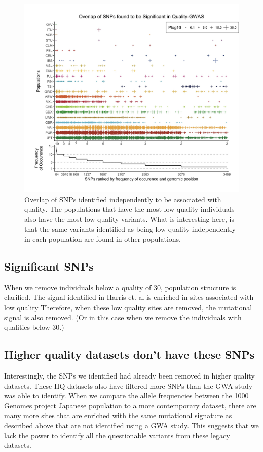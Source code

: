 \documentclass[12pt,twocolumn]{article}
\begin{document}
\begin{figure}
\includegraphics[width=\hsize,keepaspectratio]{SNPOverlap6.jpg}

\caption{Overlap of SNPs identified independently to be associated with quality. The populations that have the most low-quality individuals also have the most low-quality variants. What is interesting here, is that the same variants identified as being low quality independently in each population are found in other populations. }
  \label{Figure3}
\end{figure}

	\subsection{Significant SNPs}
When we remove individuals below a quality of 30, population structure is clarified. 
The signal identified in Harris et. al is enriched in sites associated with low quality
Therefore, when these low quality sites are removed, the mutational signal is also removed. (Or in this case when we remove the individuals with qualities below 30.)

	\subsection{Higher quality datasets don't have these SNPs}

Interestingly, the SNPs we identified had already been removed in higher quality datasets. 
These HQ datasets also have filtered more SNPs than the GWA study was able to identify. 
When we compare the allele frequencies between the 1000 Genomes project Japanese population to a more contemporary dataset, there are many more sites that are enriched with the same mutational signature as described above that are not identified using a GWA study. 
This suggests that we lack the power to identify all the questionable variants from these legacy datasets. 
\end{document}

